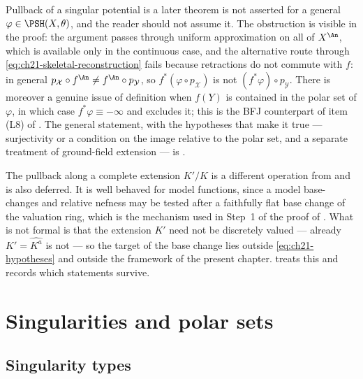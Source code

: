 \begin{warning}{Pullback of a singular potential is a later theorem}
 is not asserted for a general
$\varphi\in\PSH(X,\theta)$, and the reader should not assume it.  The
obstruction is visible in the proof: the argument passes through uniform
approximation on all of $X^{\An}$, which is available only in the
continuous case, and the alternative route through
\eqref{eq:ch21-skeletal-reconstruction} fails because retractions do not
commute with $f$: in general
$p_{\mathcal X}\circ f^{\An}\neq f^{\An}\circ p_{\mathcal Y}$, so
$f^*(\varphi\circ p_{\mathcal X})$ is not $(f^*\varphi)\circ
p_{\mathcal Y}$.  There is moreover a genuine issue of definition when
$f(Y)$ is contained in the polar set of $\varphi$, in which case
$f^*\varphi\equiv-\infty$ and  excludes it; this is
the BFJ counterpart of item (L8) of .  The
general statement, with the hypotheses that make it true --- surjectivity or
a condition on the image relative to the polar set, and a separate treatment
of ground-field extension --- is
.
\end{warning}

\begin{remark}
\label{rem:ch21-base-change}
The pullback along a complete extension $K'/K$ is a different operation
from  and is also deferred.  It is well behaved for
model functions, since a model base-changes and relative nefness may be
tested after a faithfully flat base change of the valuation ring, which is
the mechanism used in Step~1 of the proof of
.  What is not formal is that the
extension $K'$ need not be discretely valued --- already
$K'=\widehat{K^a}$ is not --- so the target of the base change lies
outside \eqref{eq:ch21-hypotheses} and outside the framework of the present
chapter.   treats this and records which
statements survive.
\end{remark}

\section{Singularities and polar sets}
\label{sec:ch21-singularities}

\subsection{Singularity types}
\label{sec:ch21-singularity-types}


